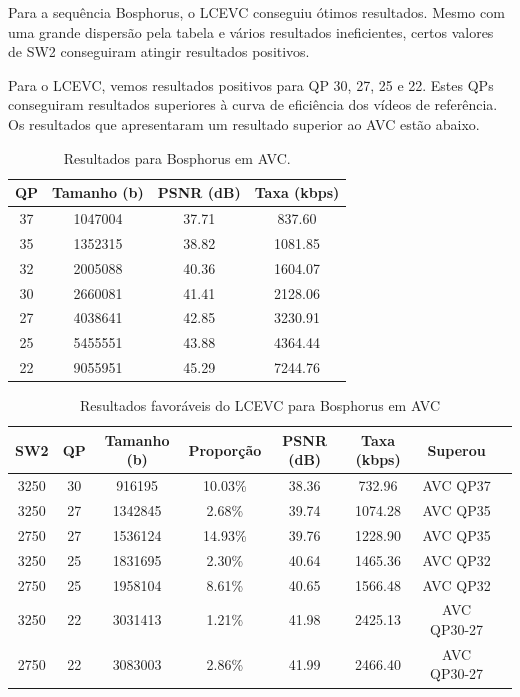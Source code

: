 Para a sequência Bosphorus, o \acrshort{LCEVC} conseguiu ótimos resultados. Mesmo
com uma grande dispersão pela tabela e vários resultados ineficientes, certos valores
de SW2 conseguiram atingir resultados positivos.

Para o \acrshort{LCEVC}, vemos resultados positivos para QP 30, 27, 25 e 22. Estes
QPs conseguiram resultados superiores à curva de eficiência dos vídeos de referência.
Os resultados que apresentaram um resultado superior ao \acrshort{AVC} estão abaixo.

\begin{table}[h]
    \centering
    \begin{tabular}{|c|c|c|c|}
        \hline
        \textbf{QP} & \textbf{Tamanho (b)} & \textbf{PSNR (dB)} & \textbf{Taxa (kbps)} \\
        \hline
        37 & 1047004 & 37.71 & 837.60 \\
        35 & 1352315 & 38.82 & 1081.85 \\
        32 & 2005088 & 40.36 & 1604.07 \\
        30 & 2660081 & 41.41 & 2128.06 \\
        27 & 4038641 & 42.85 & 3230.91 \\
        25 & 5455551 & 43.88 & 4364.44 \\
        22 & 9055951 & 45.29 & 7244.76 \\
        \hline
    \end{tabular}
    \caption{Resultados para Bosphorus em AVC.}
    \label{tab:bosphorus-avc}
\end{table}

\begin{table}[h]
    \centering
    \label{tab:bosphorus-avc-lcevc}
    \begin{tabular}{|c|c|c|c|c|c|c|c|}
        \hline
        \textbf{SW2} & \textbf{QP} & \textbf{Tamanho (b)} & \textbf{Proporção} & \textbf{PSNR (dB)} & \textbf{Taxa (kbps)} & \textbf{Superou} \\
        \hline
        3250 & 30 & 916195 & 10.03\% & 38.36 & 732.96 & AVC QP37\\
        3250 & 27 & 1342845 & 2.68\% & 39.74 & 1074.28 & AVC QP35\\
        2750 & 27 & 1536124 & 14.93\% & 39.76 & 1228.90 & AVC QP35\\
        3250 & 25 & 1831695 & 2.30\% & 40.64 & 1465.36 & AVC QP32\\
        2750 & 25 & 1958104 & 8.61\% & 40.65 & 1566.48 & AVC QP32\\
        3250 & 22 & 3031413 & 1.21\% & 41.98 & 2425.13 & AVC QP30-27\\
        2750 & 22 & 3083003 & 2.86\% & 41.99 & 2466.40 & AVC QP30-27\\
        \hline
    \end{tabular}
    \caption{Resultados favoráveis do LCEVC para Bosphorus em AVC}
\end{table}

